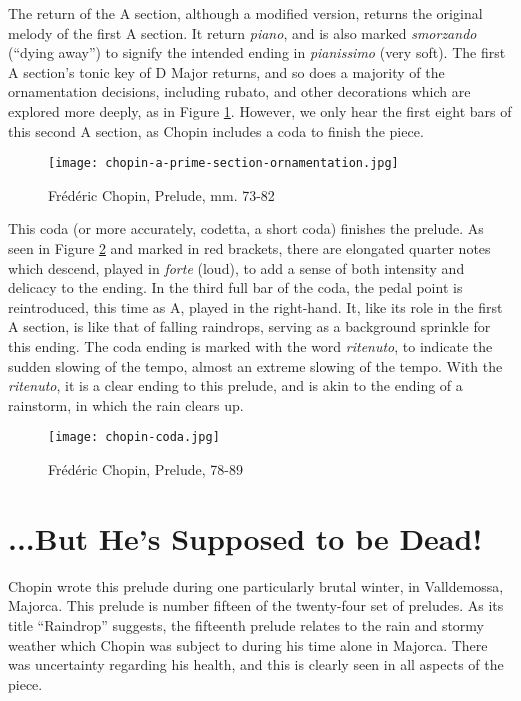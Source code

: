 The return of the A section, although a modified version, returns the original melody of the first A section. It return \textit{piano}, and is also marked \textit{smorzando} (``dying away'') to signify the intended ending in \textit{pianissimo} (very soft). The first A section's tonic key of D\musFlat{} Major returns, and so does a majority of the ornamentation decisions, including rubato, and other decorations which are explored more deeply, as in Figure \ref{fig:chopin-a-prime-section-ornamentation}\autocite{Hansen_1973}. However, we only hear the first eight bars of this second A section, as Chopin includes a coda to finish the piece.

\begin{figure}[h]
  \centering
  \texttt{[image: chopin-a-prime-section-ornamentation.jpg]}
  \caption{Frédéric Chopin, Prelude, mm. 73-82}
  \label{fig:chopin-a-prime-section-ornamentation}
\end{figure}

This coda (or more accurately, codetta, a short coda) finishes the prelude. As seen in Figure \ref{fig:chopin-coda}\autocite{Hansen_1973} and marked in red brackets, there are elongated quarter notes which descend, played in \textit{forte} (loud), to add a sense of both intensity and delicacy to the ending. In the third full bar of the coda, the pedal point is reintroduced, this time as A\musFlat{}, played in the right-hand. It, like its role in the first A section, is like that of falling raindrops, serving as a background sprinkle for this ending. The coda ending is marked with the word \textit{ritenuto}\autocite{Cole_Schwartza}, to indicate the sudden slowing of the tempo, almost an extreme slowing of the tempo. With the \textit{ritenuto}, it is a clear ending to this prelude, and is akin to the ending of a rainstorm, in which the rain clears up.

\begin{figure}[h]
  \centering
  \texttt{[image: chopin-coda.jpg]}
  \caption{Frédéric Chopin, Prelude, 78-89}
  \label{fig:chopin-coda}
\end{figure}

\section{...But He's Supposed to be Dead!}\label{section:chopin-interpretation}

Chopin wrote this prelude during one particularly brutal winter, in Valldemossa, Majorca. This prelude is number fifteen of the twenty-four set of preludes. As its title ``Raindrop'' suggests, the fifteenth prelude relates to the rain and stormy weather which Chopin was subject to during his time alone in Majorca. There was uncertainty regarding his health, and this is clearly seen in all aspects of the piece.

